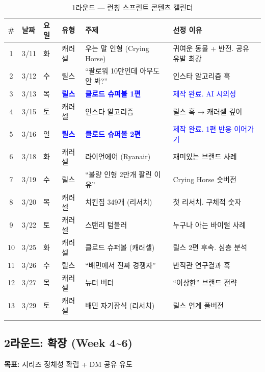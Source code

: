 \documentclass[11pt, a4paper]{article}
\begin{document}
\begin{longtable}{c l l l p{4.5cm} p{4cm}}
\toprule
\textbf{\#} & \textbf{날짜} & \textbf{요일} & \textbf{유형} & \textbf{주제} & \textbf{선정 이유} \\
\midrule
\endhead
1 & 3/11 & 화 & 캐러셀 & 우는 말 인형 (Crying Horse) & 귀여운 동물 + 반전. 공유 유발 최강 \\
2 & 3/12 & 수 & 릴스 & ``팔로워 10만인데 아무도 안 봐?'' & 인스타 알고리즘 훅 \\
3 & 3/13 & 목 & \textcolor{blue}{\textbf{릴스}} & \textcolor{blue}{\textbf{클로드 슈퍼볼 1편}} & \textcolor{blue}{제작 완료. AI 시의성} \\
4 & 3/15 & 토 & 캐러셀 & 인스타 알고리즘 & 릴스 훅 → 캐러셀 깊이 \\
5 & 3/16 & 일 & \textcolor{blue}{\textbf{릴스}} & \textcolor{blue}{\textbf{클로드 슈퍼볼 2편}} & \textcolor{blue}{제작 완료. 1편 반응 이어가기} \\
\midrule
6 & 3/18 & 화 & 캐러셀 & 라이언에어 (Ryanair) & 재미있는 브랜드 사례 \\
7 & 3/19 & 수 & 릴스 & ``불량 인형 2만개 팔린 이유'' & Crying Horse 숏버전 \\
8 & 3/20 & 목 & 캐러셀 & 치킨집 349개 (리서치) & 첫 리서치. 구체적 숫자 \\
9 & 3/22 & 토 & 캐러셀 & 스탠리 텀블러 & 누구나 아는 바이럴 사례 \\
\midrule
10 & 3/25 & 화 & 캐러셀 & 클로드 슈퍼볼 (캐러셀) & 릴스 2편 후속. 심층 분석 \\
11 & 3/26 & 수 & 릴스 & ``배민에서 진짜 경쟁자'' & 반직관 연구결과 훅 \\
12 & 3/27 & 목 & 캐러셀 & 뉴터 버터 & ``이상한'' 브랜드 전략 \\
13 & 3/29 & 토 & 캐러셀 & 배민 자기잠식 (리서치) & 릴스 연계 풀버전 \\
\bottomrule
\caption{1라운드 — 런칭 스프린트 콘텐츠 캘린더}
\end{longtable}

\subsection{2라운드: 확장 (Week 4\textasciitilde 6)}

\begin{tcolorbox}[colback=lightgreen, colframe=accent]
\textbf{목표:} 시리즈 정체성 확립 + DM 공유 유도
\end{tcolorbox}

\vspace{0.5em}
\end{document}
